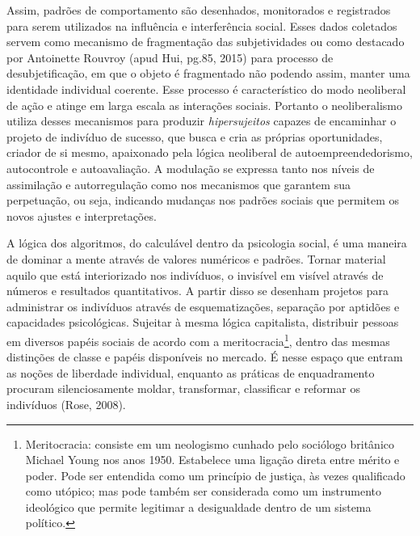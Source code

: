 Assim, padrões de comportamento são desenhados, monitorados e
registrados para serem utilizados na influência e interferência social.
Esses dados coletados servem como mecanismo de fragmentação das
subjetividades ou como destacado por Antoinette Rouvroy (apud Hui,
pg.85, 2015) para processo de desubjetificação, em que o objeto é
fragmentado não podendo assim, manter uma identidade individual
coerente. Esse processo é característico do modo neoliberal de ação e
atinge em larga escala as interações sociais. Portanto o neoliberalismo
utiliza desses mecanismos para produzir \emph{hipersujeitos} capazes de
encaminhar o projeto de indivíduo de sucesso, que busca e cria as
próprias oportunidades, criador de si mesmo, apaixonado pela lógica
neoliberal de autoempreendedorismo, autocontrole e autoavaliação. A
modulação se expressa tanto nos níveis de assimilação e autorregulação
como nos mecanismos que garantem sua perpetuação, ou seja, indicando
mudanças nos padrões sociais que permitem os novos ajustes e
interpretações.

A lógica dos algoritmos, do calculável dentro da psicologia social, é
uma maneira de dominar a mente através de valores numéricos e padrões.
Tornar material aquilo que está interiorizado nos indivíduos, o
invisível em visível através de números e resultados quantitativos. A
partir disso se desenham projetos para administrar os indivíduos através
de esquematizações, separação por aptidões e capacidades psicológicas.
Sujeitar à mesma lógica capitalista, distribuir pessoas em diversos
papéis sociais de acordo com a meritocracia\footnote{Meritocracia:
  consiste em um neologismo cunhado pelo sociólogo britânico Michael
  Young nos anos 1950. Estabelece uma ligação direta entre mérito e
  poder. Pode ser entendida como um princípio de justiça, às vezes
  qualificado como utópico; mas pode também ser considerada como um
  instrumento ideológico que permite legitimar a desigualdade dentro de
  um sistema político.}, dentro das mesmas distinções de classe e papéis
disponíveis no mercado. É nesse espaço que entram as noções de liberdade
individual, enquanto as práticas de enquadramento procuram
silenciosamente moldar, transformar, classificar e reformar os
indivíduos (Rose, 2008).

